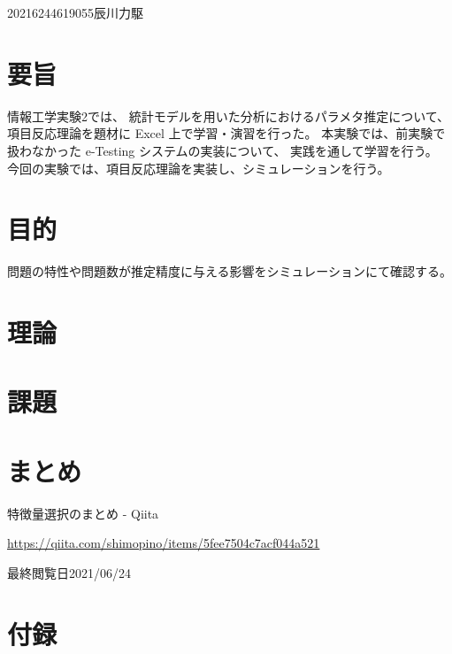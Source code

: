 \documentclass[12pt]{jarticle}
\begin{document}
{2021}{6}{24}{4619055}{辰川力駆}
\section{要旨}

情報工学実験2では、
統計モデルを用いた分析におけるパラメタ推定について、
項目反応理論を題材に Excel 上で学習・演習を行った。
本実験では、前実験で扱わなかった e-Testing システムの実装について、
実践を通して学習を行う。
今回の実験では、項目反応理論を実装し、シミュレーションを行う。

\section{目的}
問題の特性や問題数が推定精度に与える影響をシミュレーションにて確認する。

\section{理論}
\section{課題}
\section{まとめ}



\clearpage
\begin{thebibliography}{99}
    \label{sannkoubunnkenn_chapter}
    特徴量選択のまとめ - Qiita

    \url{https://qiita.com/shimopino/items/5fee7504c7acf044a521}

    最終閲覧日2021/06/24
\end{thebibliography}

\clearpage
\appendix
\section{付録}
\begin{lstlisting}[style = php,caption=1\_functions.php]

\end{lstlisting}

\end{document}
